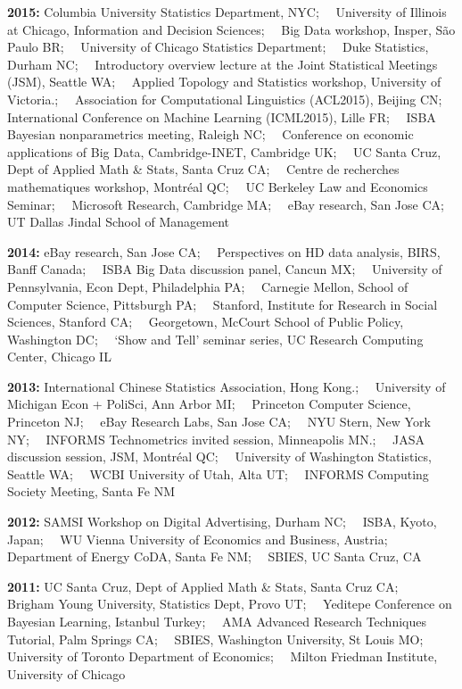 \documentclass[margin,line]{res}
\begin{document}
\begin{resume}
{\bf 2015:} Columbia University Statistics Department, NYC;~~ University of Illinois at Chicago, Information and Decision Sciences;~~ Big Data workshop, Insper, S\~ao Paulo BR;~~ University of Chicago Statistics Department;~~ Duke Statistics, Durham NC;~~ Introductory overview lecture at the Joint Statistical Meetings (JSM), Seattle WA;~~ Applied Topology and Statistics workshop, University of Victoria.;~~ Association for Computational Linguistics (ACL2015), Beijing CN;~~ International Conference on Machine Learning (ICML2015), Lille FR;~~ ISBA Bayesian nonparametrics meeting, Raleigh NC;~~ Conference on economic applications of Big Data, Cambridge-INET, Cambridge UK;~~ UC Santa Cruz, Dept of Applied Math \& Stats, Santa Cruz CA;~~ Centre de recherches mathematiques workshop, Montr\'eal QC;~~ UC Berkeley Law and Economics Seminar;~~ Microsoft Research, Cambridge MA;~~ eBay research, San Jose CA;~~ UT Dallas Jindal School of Management


{\bf 2014:} eBay research, San Jose CA;~~ Perspectives on HD data analysis, BIRS, Banff Canada;~~ ISBA Big Data discussion panel, Cancun MX;~~ University of Pennsylvania, Econ Dept, Philadelphia PA;~~ Carnegie Mellon, School of Computer Science, Pittsburgh PA;~~ Stanford, Institute for Research in Social Sciences, Stanford CA;~~ Georgetown, McCourt School of Public Policy, Washington DC;~~ `Show and Tell' seminar series, UC Research Computing Center, Chicago IL

{\bf 2013:} International Chinese Statistics Association, Hong Kong.;~~ University of Michigan Econ + PoliSci, Ann Arbor MI;~~ Princeton Computer Science, Princeton NJ;~~ eBay Research Labs, San Jose CA;~~ NYU Stern, New York NY;~~ INFORMS Technometrics invited session, Minneapolis MN.;~~ JASA discussion session, JSM, Montr\'eal QC;~~ University of Washington Statistics, Seattle WA;~~ WCBI University of Utah, Alta UT;~~ INFORMS Computing Society Meeting, Santa Fe NM


{\bf 2012:} SAMSI Workshop on Digital Advertising, Durham NC;~~ ISBA, Kyoto, Japan;~~ WU Vienna University of Economics and Business, Austria;~~ Department of Energy CoDA, Santa Fe NM;~~ SBIES, UC Santa Cruz, CA




{\bf 2011:} UC Santa Cruz, Dept of Applied Math \& Stats, Santa Cruz CA;~~ Brigham Young University, Statistics Dept, Provo UT;~~ Yeditepe Conference on Bayesian Learning, Istanbul Turkey;~~ AMA Advanced Research Techniques Tutorial,  Palm Springs CA;~~ SBIES, Washington University, St Louis MO;~~ University of Toronto Department of Economics;~~ Milton Friedman Institute, University of Chicago



\end{resume}
\end{document}
